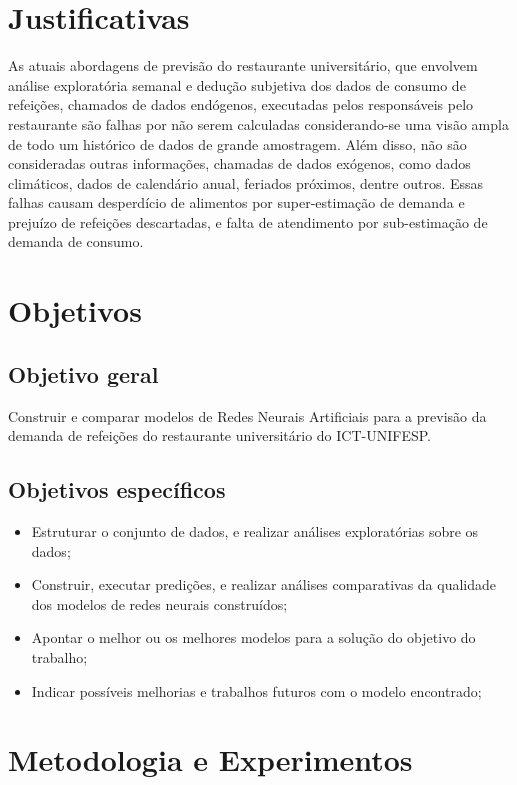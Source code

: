 \documentclass[	12pt, Times, openright, twoside, a4paper, english, brazil]{abntex2}
\begin{document}
      \section{Justificativas}
        As atuais abordagens de previsão do restaurante universitário, que envolvem análise exploratória semanal e dedução subjetiva dos dados de consumo de refeições, chamados de dados endógenos, executadas pelos responsáveis pelo restaurante são falhas por não serem calculadas considerando-se uma visão ampla de todo um histórico de dados de grande amostragem. Além disso, não são consideradas outras informações, chamadas de dados exógenos, como dados climáticos, dados de calendário anual, feriados próximos, dentre outros. Essas falhas causam desperdício de alimentos por super-estimação de demanda e prejuízo de refeições descartadas, e falta de atendimento por sub-estimação de demanda de consumo.

      \section{Objetivos}
        \subsection{Objetivo geral}
          Construir e comparar modelos de Redes Neurais Artificiais para a previsão da demanda de
          refeições do restaurante universitário do ICT-UNIFESP.
        
        \subsection{Objetivos específicos}
          \begin{itemize}
          \item Estruturar o conjunto de dados, e realizar análises exploratórias sobre os dados; 
          \item Construir, executar predições, e realizar análises comparativas da qualidade dos modelos de redes neurais construídos;
          \item Apontar o melhor ou os melhores modelos para a solução do objetivo do trabalho;
          \item Indicar possíveis melhorias e trabalhos futuros com o modelo encontrado;
          \end{itemize}
           
      \section{Metodologia e Experimentos}
\end{document}

